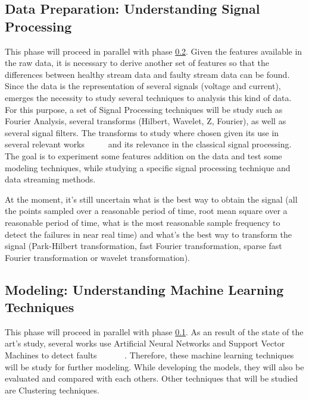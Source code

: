 \subsection{Data Preparation: Understanding Signal Processing}
\label{subsec:data_prep_studying_signal}

This phase will proceed in parallel with phase \ref{subsec:modeling_under_machine_learning}. Given the features available in the raw data, it is necessary to derive another set of features so that the differences between healthy stream data and faulty stream data can be found. Since the data is the representation of several signals (voltage and current), emerges the necessity to study several techniques to analysis this kind of data. For this purpose, a set of Signal Processing techniques will be study such as Fourier Analysis, several transforms (Hilbert, Wavelet, Z, Fourier), as well as several signal filters.
The transforms to study where chosen given its use in several relevant works ~\cite{M.a2014} ~\cite{Riera-Guasp2015} ~\cite{Cheng2011} and its relevance in the classical signal processing.
The goal is to experiment some features addition on the data and test some modeling techniques, while studying a specific signal processing technique and data streaming methods.

At the moment, it's still uncertain what is the best way to obtain the signal (all the points sampled over a reasonable period of time, root mean square over a reasonable period of time, what is the most reasonable sample frequency to detect the failures in near real time) and what's the best way to transform the signal (Park-Hilbert transformation, fast Fourier transformation, sparse fast Fourier transformation or wavelet transformation).


\subsection{Modeling: Understanding Machine Learning Techniques}
\label{subsec:modeling_under_machine_learning}

This phase will proceed in parallel with phase \ref{subsec:data_prep_studying_signal}. As an result of the state of the art's study, several works use Artificial Neural Networks and Support Vector Machines to detect faults ~\cite{Toma2011} ~\cite{Wolkiewicz2013} ~\cite{Patel2016} ~\cite{Jagadanand2015}. Therefore, these machine learning techniques will be study for further modeling. While developing the models, they will also be evaluated and compared with each others.  
Other techniques that will be studied are Clustering techniques.

